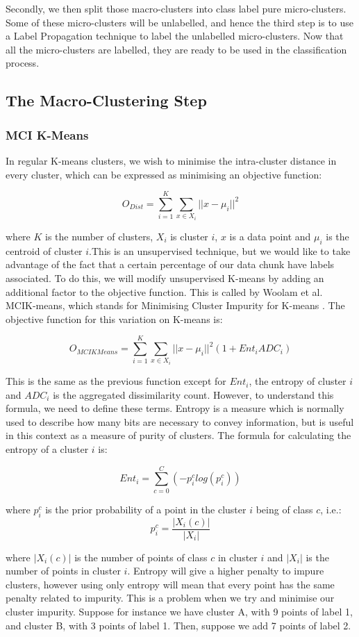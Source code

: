 \documentclass[12pt,a4paper,oneside]{report}
\begin{document}
Secondly, we then split those macro-clusters into class label pure micro-clusters. Some of these micro-clusters will be unlabelled, and hence the third step is to use a Label Propagation technique to label the unlabelled micro-clusters. Now that all the micro-clusters are labelled, they are ready to be used in the classification process. 

\subsection{The Macro-Clustering Step}

\subsubsection{MCI K-Means}
 In regular K-means clusters, we wish to minimise the intra-cluster distance in every cluster, which can be expressed  as minimising an objective function: 
 
 \[ O_{Dist} = \sum_{i=1}^K \sum_{x\in X_i}|| x - \mu_i||^2 \]
 
where $K$ is the number of clusters, $X_i$ is cluster $i$, $x$ is a data point and $\mu_i$ is the centroid of cluster $i$.This is an unsupervised technique, but we would like to take advantage of the fact that a certain percentage of our data chunk have labels associated. To do this, we will modify unsupervised K-means by adding an additional factor to the objective function. This is called by Woolam et al. MCIK-means, which stands for Minimising Cluster Impurity for K-means \cite{LabStr}. The objective function for this variation on K-means is:
 
 \[ O_{MCIKMeans} = \sum_{i=1}^K \sum_{x\in X_i}|| x - \mu_i||^2(1 + Ent_iADC_i)\]

This is the same as the previous function except for $Ent_i$, the entropy of cluster $i$ and $ADC_i$ is the aggregated dissimilarity count. However, to understand this formula, we need to define these terms. 
Entropy is a measure which is normally used to describe how many bits are necessary to convey information, but is useful in this context as a measure of purity of clusters. The formula for calculating the entropy of a cluster \(i\) is:
 
\[Ent_i = \sum_{c=0}^C(-p_i^clog(p_i^c))\] 

where \(p_i^c\) is the prior probability of a point in the cluster \(i\) being of class \(c\), i.e.:
\[p_i^c = \frac{|X_i(c)|}{|X_i|}\] 

where $|X_i(c)|$ is the number of points of class $c$ in cluster $i$ and $|X_i|$ is the number of points in cluster $i$. 
Entropy will give a higher penalty to impure clusters, however using only entropy will mean that every point has the same penalty related to impurity. This is a problem when we try and minimise our cluster impurity. Suppose for instance we have cluster A, with 9 points of label 1, and cluster B, with 3 points of label 1. Then, suppose we add 7 points of label 2. 
\end{document}
